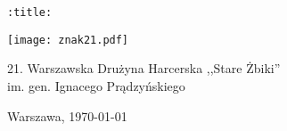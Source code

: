 \documentclass[a5paper,10pt]{extbook}
\begin{document}
\thispagestyle{empty}
\begin{center}
{\Huge\verb|:title:|}

\large

\texttt{[image: znak21.pdf]}

21. Warszawska Drużyna Harcerska ,,Stare Żbiki''\\
im. gen. Ignacego Prądzyńskiego

Warszawa, \today
{}
\end{center}

\cleardoublepage
\end{document}

